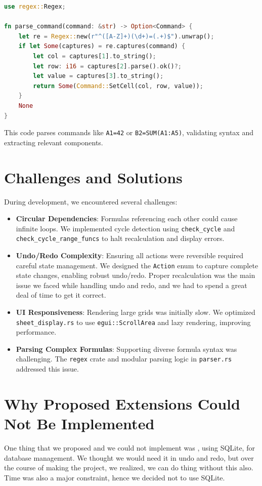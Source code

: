 \documentclass{article}
\begin{document}
\begin{lstlisting}[language=Rust, caption={Example of command parsing in \texttt{parser.rs}}]
use regex::Regex;

fn parse_command(command: &str) -> Option<Command> {
    let re = Regex::new(r"^([A-Z]+)(\d+)=(.+)$").unwrap();
    if let Some(captures) = re.captures(command) {
        let col = captures[1].to_string();
        let row: i16 = captures[2].parse().ok()?;
        let value = captures[3].to_string();
        return Some(Command::SetCell(col, row, value));
    }
    None
}
\end{lstlisting}

This code parses commands like \texttt{A1=42} or \texttt{B2=SUM(A1:A5)}, validating syntax and extracting relevant components.

\section{Challenges and Solutions}
During development, we encountered several challenges:

\begin{itemize}
    \item \textbf{Circular Dependencies}: Formulas referencing each other could cause infinite loops. We implemented cycle detection using \texttt{check\_cycle} and \texttt{check\_cycle\_range\_funcs} to halt recalculation and display errors.
    \item \textbf{Undo/Redo Complexity}: Ensuring all actions were reversible required careful state management. We designed the \texttt{Action} enum to capture complete state changes, enabling robust undo/redo. Proper recalculation was the main issue we faced while handling undo and redo, and we had to spend a great deal of time to get it correct.
    \item \textbf{UI Responsiveness}: Rendering large grids was initially slow. We optimized \texttt{sheet\_display.rs} to use \texttt{egui::ScrollArea} and lazy rendering, improving performance.
    \item \textbf{Parsing Complex Formulas}: Supporting diverse formula syntax was challenging. The \texttt{regex} crate and modular parsing logic in \texttt{parser.rs} addressed this issue.
\end{itemize}

\section{Why Proposed Extensions Could Not Be Implemented}
One thing that we proposed and we could not implement was , using SQLite, for database management. We thought we would need it in undo and redo, but over the course of  making the project, we realized, we can do thing without this also. Time was also a major constraint,  hence we decided not to use SQLite.
\end{document}
